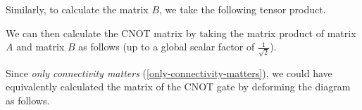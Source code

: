 Similarly, to calculate the matrix $B$, we take the following tensor product.


We can then calculate the CNOT matrix by taking the matrix product of matrix $A$ and matrix $B$ as follows (up to a global scalar factor of $\frac{1}{\sqrt 2}$).


Since \textit{only connectivity matters} (\ref{only-connectivity-matters}), we could have equivalently calculated the matrix of the CNOT gate by deforming the diagram as follows.

\vspace{10pt}

